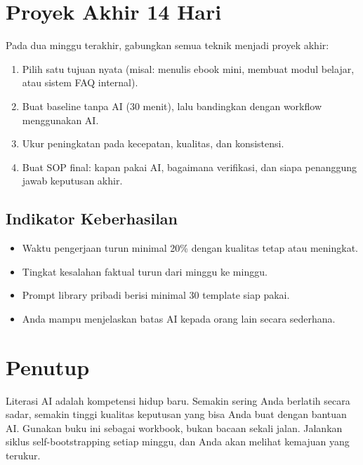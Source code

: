 \documentclass[12pt,oneside]{book}
\begin{document}
\chapter{Proyek Akhir 14 Hari}
Pada dua minggu terakhir, gabungkan semua teknik menjadi proyek akhir:
\begin{enumerate}[leftmargin=*]
\item Pilih satu tujuan nyata (misal: menulis ebook mini, membuat modul belajar, atau sistem FAQ internal).
\item Buat baseline tanpa AI (30 menit), lalu bandingkan dengan workflow menggunakan AI.
\item Ukur peningkatan pada kecepatan, kualitas, dan konsistensi.
\item Buat SOP final: kapan pakai AI, bagaimana verifikasi, dan siapa penanggung jawab keputusan akhir.
\end{enumerate}

\section*{Indikator Keberhasilan}
\begin{itemize}[leftmargin=*]
\item Waktu pengerjaan turun minimal 20\% dengan kualitas tetap atau meningkat.
\item Tingkat kesalahan faktual turun dari minggu ke minggu.
\item Prompt library pribadi berisi minimal 30 template siap pakai.
\item Anda mampu menjelaskan batas AI kepada orang lain secara sederhana.
\end{itemize}
\clearpage

\backmatter
\chapter*{Penutup}
Literasi AI adalah kompetensi hidup baru. Semakin sering Anda berlatih secara sadar, semakin tinggi kualitas keputusan yang bisa Anda buat dengan bantuan AI. Gunakan buku ini sebagai workbook, bukan bacaan sekali jalan. Jalankan siklus self-bootstrapping setiap minggu, dan Anda akan melihat kemajuan yang terukur.
\end{document}
